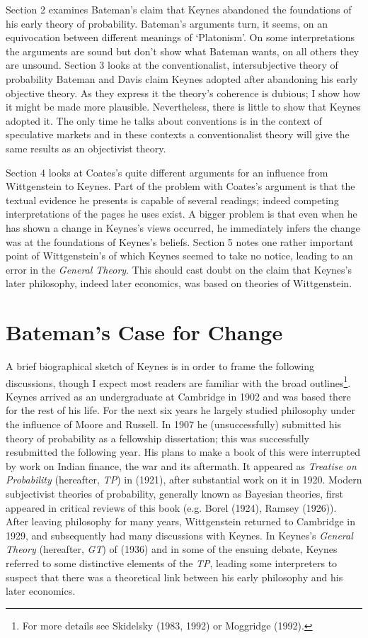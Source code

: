 \documentclass[noflushend]{philosophersimprint}
\begin{document}
Section 2 examines Bateman's claim that Keynes abandoned the foundations
of his early theory of probability. Bateman's arguments turn, it seems,
on an equivocation between different meanings of `Platonism'. On some
interpretations the arguments are sound but don't show what Bateman
wants, on all others they are unsound. Section 3 looks at the
conventionalist, intersubjective theory of probability Bateman and Davis
claim Keynes adopted after abandoning his early objective theory. As
they express it the theory's coherence is dubious; I show how it might
be made more plausible. Nevertheless, there is little to show that
Keynes adopted it. The only time he talks about conventions is in the
context of speculative markets and in these contexts a conventionalist
theory will give the same results as an objectivist theory.

Section 4 looks at Coates's quite different arguments for an influence
from Wittgenstein to Keynes. Part of the problem with Coates's argument
is that the textual evidence he presents is capable of several readings;
indeed competing interpretations of the pages he uses exist. A bigger
problem is that even when he has shown a change in Keynes's views
occurred, he immediately infers the change was at the foundations of
Keynes's beliefs. Section 5 notes one rather important point of
Wittgenstein's of which Keynes seemed to take no notice, leading to an
error in the \emph{General Theory}. This should cast doubt on the claim
that Keynes's later philosophy, indeed later economics, was based on
theories of Wittgenstein.

\hypertarget{batemans-case-for-change}{%
\section{Bateman's Case for Change}\label{batemans-case-for-change}}

A brief biographical sketch of Keynes is in order to frame the following
discussions, though I expect most readers are familiar with the broad
outlines\footnote{For more details see Skidelsky (1983, 1992) or
  Moggridge (1992).}. Keynes arrived as an undergraduate at Cambridge in
1902 and was based there for the rest of his life. For the next six
years he largely studied philosophy under the influence of Moore and
Russell. In 1907 he (unsuccessfully) submitted his theory of probability
as a fellowship dissertation; this was successfully resubmitted the
following year. His plans to make a book of this were interrupted by
work on Indian finance, the war and its aftermath. It appeared as
\emph{Treatise on Probability} (hereafter, \emph{TP}) in (1921), after
substantial work on it in 1920. Modern subjectivist theories of
probability, generally known as Bayesian theories, first appeared in
critical reviews of this book (e.g. Borel (1924), Ramsey (1926)). After
leaving philosophy for many years, Wittgenstein returned to Cambridge in
1929, and subsequently had many discussions with Keynes. In Keynes's
\emph{General Theory} (hereafter, \emph{GT}) of (1936) and in some of
the ensuing debate, Keynes referred to some distinctive elements of the
\emph{TP}, leading some interpreters to suspect that there was a
theoretical link between his early philosophy and his later economics.
\end{document}
